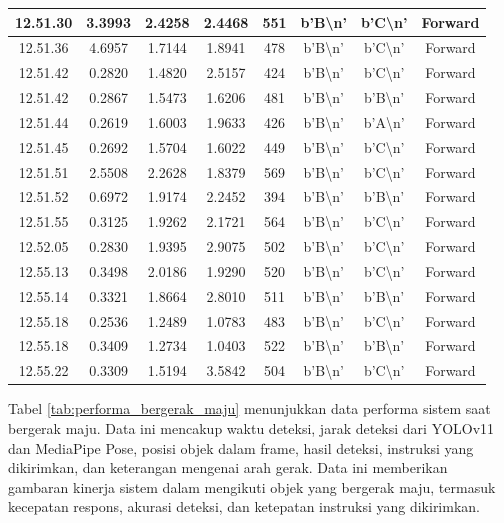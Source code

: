 \begin{table}[H]
\begin{tabular}{|c|c|c|c|c|c|c|c|}
    12.51.30 & 3.3993 & 2.4258 & 2.4468 & 551 & b'B\textbackslash n' & b'C\textbackslash n' & Forward \\ \hline
    12.51.36 & 4.6957 & 1.7144 & 1.8941 & 478 & b'B\textbackslash n' & b'C\textbackslash n' & Forward \\ \hline
    12.51.42 & 0.2820 & 1.4820 & 2.5157 & 424 & b'B\textbackslash n' & b'C\textbackslash n' & Forward \\ \hline
    12.51.42 & 0.2867 & 1.5473 & 1.6206 & 481 & b'B\textbackslash n' & b'B\textbackslash n' & Forward \\ \hline
    12.51.44 & 0.2619 & 1.6003 & 1.9633 & 426 & b'B\textbackslash n' & b'A\textbackslash n' & Forward \\ \hline
    12.51.45 & 0.2692 & 1.5704 & 1.6022 & 449 & b'B\textbackslash n' & b'C\textbackslash n' & Forward \\ \hline
    12.51.51 & 2.5508 & 2.2628 & 1.8379 & 569 & b'B\textbackslash n' & b'C\textbackslash n' & Forward \\ \hline
    12.51.52 & 0.6972 & 1.9174 & 2.2452 & 394 & b'B\textbackslash n' & b'B\textbackslash n' & Forward \\ \hline
    12.51.55 & 0.3125 & 1.9262 & 2.1721 & 564 & b'B\textbackslash n' & b'C\textbackslash n' & Forward \\ \hline
    12.52.05 & 0.2830 & 1.9395 & 2.9075 & 502 & b'B\textbackslash n' & b'C\textbackslash n' & Forward \\ \hline
    12.55.13 & 0.3498 & 2.0186 & 1.9290 & 520 & b'B\textbackslash n' & b'C\textbackslash n' & Forward \\ \hline
    12.55.14 & 0.3321 & 1.8664 & 2.8010 & 511 & b'B\textbackslash n' & b'B\textbackslash n' & Forward \\ \hline
    12.55.18 & 0.2536 & 1.2489 & 1.0783 & 483 & b'B\textbackslash n' & b'C\textbackslash n' & Forward \\ \hline
    12.55.18 & 0.3409 & 1.2734 & 1.0403 & 522 & b'B\textbackslash n' & b'B\textbackslash n' & Forward \\ \hline
    12.55.22 & 0.3309 & 1.5194 & 3.5842 & 504 & b'B\textbackslash n' & b'C\textbackslash n' & Forward \\ \hline
    \end{tabular}
\end{table}

Tabel \ref{tab:performa_bergerak_maju} menunjukkan data performa sistem saat bergerak maju. Data ini mencakup waktu deteksi, jarak deteksi dari YOLOv11 dan MediaPipe Pose, posisi objek dalam frame, hasil deteksi, instruksi yang dikirimkan, dan keterangan mengenai arah gerak. Data ini memberikan gambaran kinerja sistem dalam mengikuti objek yang bergerak maju, termasuk kecepatan respons, akurasi deteksi, dan ketepatan instruksi yang dikirimkan.

